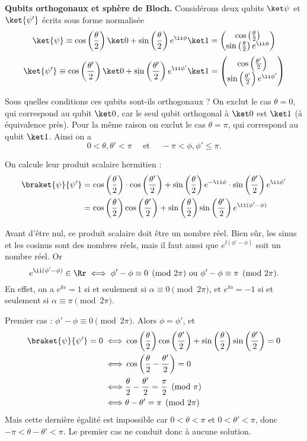 \documentclass[11pt,class=report,crop=false]{standalone}
\begin{document}
\bigskip
\textbf{Qubits orthogonaux et sphère de Bloch.}
Considérons deux qubits $\ket\psi$ et $\ket{\psi'}$ écrits sous forme normalisée 
$$\ket{\psi} \equiv \cos\left(\frac\theta2\right)\ket0+ \sin\left(\frac\theta2\right)e^{\ii\phi}\ket1 
= \begin{pmatrix}\cos\left(\frac\theta2\right) \\ \sin\left(\frac\theta2\right)e^{\ii\phi}\end{pmatrix}
$$
$$\ket{\psi'} \equiv \cos\left(\frac{\theta'}2\right)\ket0+ \sin\left(\frac{\theta'}2\right)e^{\ii\phi'}\ket1
= \begin{pmatrix}\cos\left(\frac{\theta'}2\right) \\ \sin\left(\frac{\theta'}2\right)e^{\ii\phi'}\end{pmatrix}
$$

Sous quelles conditions ces qubits sont-ils orthogonaux ?
On exclut le cas $\theta=0$, qui correspond au qubit $\ket0$,
car le seul qubit orthogonal à $\ket0$ est $\ket1$ (à équivalence près).
Pour la même raison on exclut le cas $\theta=\pi$, qui correspond au qubit $\ket1$.
Ainsi on a 
$$0<\theta,\theta'<\pi \quad \text{ et } \quad -\pi < \phi,\phi' \le \pi.$$

On calcule leur produit scalaire hermitien :
\begin{align*}
\braket{\psi}{\psi'}
&= \cos\left(\frac\theta2\right) \cdot \cos\left(\frac{\theta'}2\right)
+ \sin\left(\frac\theta2\right)e^{-\ii\phi} \cdot \sin\left(\frac{\theta'}2\right)e^{\ii\phi'} \\
&= \cos\left(\frac\theta2\right)\cos\left(\frac{\theta'}2\right)
+ \sin\left(\frac\theta2\right)\sin\left(\frac{\theta'}2\right)e^{\ii(\phi'-\phi)}
\end{align*}

Avant d'être nul, ce produit scalaire doit être un nombre réel.
Bien sûr, les sinus et les cosinus sont des nombres réels, 
mais il faut aussi que $e^{\ii(\phi'-\phi)}$ soit un nombre réel.
Or 
$$e^{\ii(\phi'-\phi)} \in \Rr \iff \phi'-\phi \equiv 0 \pmod{2\pi} \text{ ou } \phi'-\phi \equiv \pi \pmod{2\pi}.$$
En effet, on a  $e^{\ii\alpha} = 1$ si et seulement si $\alpha \equiv 0 \pmod{2\pi}$,
et  $e^{\ii\alpha} = -1$ si et seulement si $\alpha \equiv \pi \pmod{2\pi}$.

Premier cas : $\phi'-\phi \equiv 0 \pmod{2\pi}$. Alors $\phi=\phi'$, et
\begin{align*}
\braket{\psi}{\psi'} = 0
\iff& \cos\left(\frac\theta2\right)\cos\left(\frac{\theta'}2\right)
+ \sin\left(\frac\theta2\right)\sin\left(\frac{\theta'}2\right) = 0 \\
\iff& \cos\left(\frac\theta2-\frac{\theta'}2\right) = 0 \\
\iff& \frac\theta2-\frac{\theta'}2 = \frac\pi2 \pmod{\pi} \\
\iff& \theta-\theta' = \pi \pmod{2\pi} \\
\end{align*}
Mais cette dernière égalité est impossible car $0<\theta<\pi$ et $0<\theta'<\pi$, donc $-\pi<\theta-\theta'<\pi$.
Le premier cas ne conduit donc à aucune solution.
\end{document}
